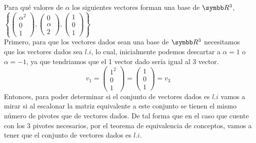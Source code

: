 \item Para qué valores de \(\alpha\) los siguientes vectores forman una base de \(\realR^3\), 
    \(
        \left\{
            \left(\begin{smallmatrix}\alpha^2 \\ 0 \\ 1\end{smallmatrix}\right),
            \left(\begin{smallmatrix}0 \\ \alpha \\ 2 \end{smallmatrix}\right),
            \left(\begin{smallmatrix}1 \\ 0 \\ 1\end{smallmatrix}\right)
        \right\}
    \) \\
    Primero, para que los vectores dados sean una base de \(\realR^3\) necesitamos que los vectores dados sea \(l.i\),
    lo cual, inicialmente podemos descartar a \(\alpha = 1\) o \(\alpha = -1\), ya que tendriamos que el 1 vector dado sería igual al 3 vector.
    \[
        v_1
        =
        \begin{pmatrix}
            1^2 \\ 0 \\ 1 
        \end{pmatrix}
        =
        \begin{pmatrix}
            1 \\ 0 \\ 1 
        \end{pmatrix}
        =
        v_3
    \]
    Entonces, para poder determinar si el conjunto de vectores dados es \(l.i\) vamos a mirar si al escalonar la matriz equivalente a este conjunto 
    se tienen el mismo número de pivotes que de vectores dados. De tal forma que en el caso que cuente con los 3 pivotes necesarios, por el teorema de 
    equivalencia de conceptos, vamos a tener que el conjunto de vectores dados es \(l.i\).
